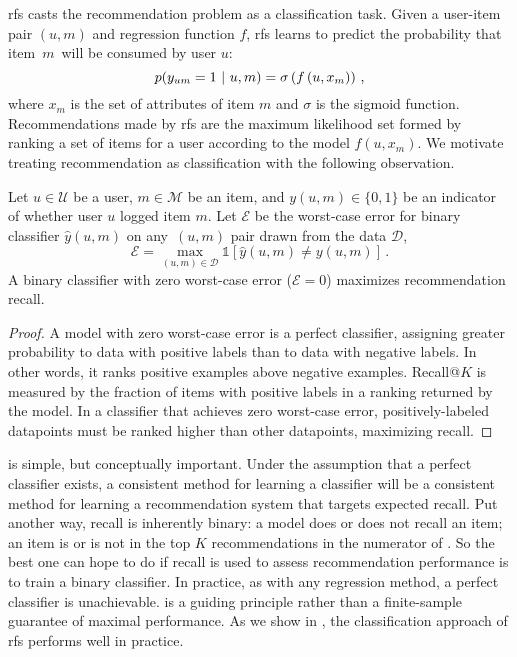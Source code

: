 \gls{rfs} casts the recommendation problem as a classification task. Given a user-item pair $(u,m)$ and regression function $f$, \gls{rfs} learns to predict the probability that item~$m$~will be consumed by user $u$:
$$p(y_{um} = 1 ~\vert~ u, m) = \sigma\left( f \left (u, x_m\right) \right)\, ,$$
where $x_m$ is the set of attributes of item $m$ and $\sigma$ is the sigmoid function. Recommendations made by \gls{rfs} are the maximum likelihood set formed by ranking a set of items for a user according to the model $f(u, x_m)$. We motivate treating recommendation as classification with the following observation.
\begin{prop}
\label{prop:maximizing-recall}
Let $u \in \mathcal{U}$ be a user, $m \in \mathcal{M}$ be an item, and
$y(u,m) \in \{0,1\}$ be an indicator of whether user $u$ logged item $m$. Let
$\mathcal{E}$ be the worst-case error for binary classifier $\hat{y}(u,m)$ on
any~$(u,m)$ pair drawn from the data $\mathcal{D}$,
\begin{equation*}
  \mathcal{E} = \max_{(u, m) \in \mathcal{D}} \mathbb{1}\left[ \hat y(u, m) \neq y(u, m) \right] \, .
\end{equation*}
A binary classifier with zero worst-case error ($\mathcal{E}=0$) maximizes
recommendation recall.
\end{prop}
\begin{proof}
  A model with zero worst-case error is a perfect classifier, assigning greater probability to data with positive labels than to data with negative labels. In other words, it ranks positive examples above negative examples. Recall@$K$ is measured by the fraction of items with positive labels in a ranking returned by the model. In a classifier that achieves zero worst-case error, positively-labeled datapoints must be ranked higher than other datapoints, maximizing recall.
\end{proof}

 is simple, but conceptually important. Under the assumption that a perfect classifier exists, a consistent method for learning a classifier will be a consistent method for learning a recommendation system that targets expected recall. Put another way, recall is inherently binary: a model does or does not recall an item; an item is or is not in the top $K$ recommendations in the numerator of . So the best one can hope to do if recall is used to assess recommendation performance is to train a binary classifier. In practice, as with any regression method, a perfect classifier is unachievable.  is a guiding principle rather than a finite-sample guarantee of maximal performance. As we show in , the classification approach of \gls{rfs} performs well in practice.

